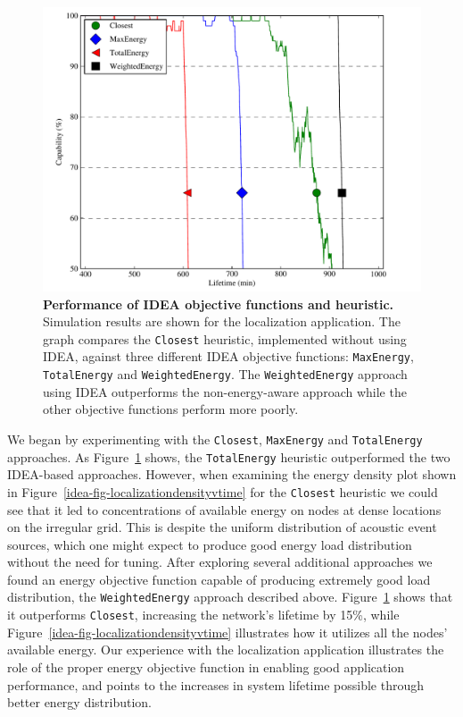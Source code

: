 \begin{figure}[t]
\begin{center}
\includegraphics[width=\hsize]{./5-idea/figs/used/ideavheuristics.pdf}
\end{center}

\caption{\textbf{Performance of IDEA objective functions and heuristic.}
Simulation results are shown for the localization application. The graph
compares the \texttt{Closest} heuristic, implemented without using IDEA,
against three different IDEA objective functions: \texttt{MaxEnergy},
\texttt{TotalEnergy} and \texttt{WeightedEnergy}. The \texttt{WeightedEnergy}
approach using IDEA outperforms the non-energy-aware approach while the other
objective functions perform more poorly.}

\label{idea-fig-ideavheuristics}
\end{figure}

We began by experimenting with the \texttt{Closest}, \texttt{MaxEnergy} and
\texttt{TotalEnergy} approaches. As Figure~\ref{idea-fig-ideavheuristics}
shows, the \texttt{TotalEnergy} heuristic outperformed the two IDEA-based
approaches. However, when examining the energy density plot shown in
Figure~\ref{idea-fig-localizationdensityvtime} for the \texttt{Closest}
heuristic we could see that it led to concentrations of available energy on
nodes at dense locations on the irregular grid. This is despite the uniform
distribution of acoustic event sources, which one might expect to produce
good energy load distribution without the need for tuning. After exploring
several additional approaches we found an energy objective function capable
of producing extremely good load distribution, the \texttt{WeightedEnergy}
approach described above. Figure~\ref{idea-fig-ideavheuristics} shows that it
outperforms \texttt{Closest}, increasing the network's lifetime by 15\%,
while Figure~\ref{idea-fig-localizationdensityvtime} illustrates how it
utilizes all the nodes' available energy. Our experience with the
localization application illustrates the role of the proper energy objective
function in enabling good application performance, and points to the
increases in system lifetime possible through better energy distribution. 
